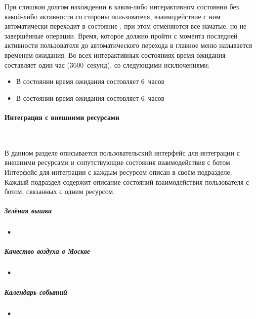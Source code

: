     При слишком долгом нахождении в каком-либо интерактивном состоянии без какой-либо активности
    со стороны пользователя, взаимодействие с ним автоматически переходит в состояние
    \hyperref[itm:req:ui:states:mainmenu]
    {}, при этом отменяются все начатые, но не завершённые операции.
    Время, которое должно пройти с момента последней активности пользователя до
    автоматического перехода в главное меню называется временем ожидания. Во всех интерактивных
    состояниях время ожидания составляет один час (3600~секунд), со следующими исключениями:
    \begin{itemize}
        \item
            В состоянии
            \hyperref[itm:req:ui:states:edit-note]
            {}
            время ожидания состовляет 6~часов
        \item
            В состоянии
            \hyperref[itm:req:ui:states:create-note]
            {}
            время ожидания состовляет 6~часов
    \end{itemize}

    \paragraph{Интеграция с внешними ресурсами}
        \label{par:req:ui:states:integrations}
        ~\par
        В данном разделе описывается пользовательский интерфейс для интеграции с внешними
        ресурсами и сопутствующие состояния взаимодействия с ботом.
        Интерфейс для интеграции с каждым ресурсом описан в своём подразделе.
        Каждый подраздел содержит описание состояний взаимодействия пользователя с ботом,
        связанных с одним ресурсом.

        \subparagraph{Зелёная вышка}
            \begin{itemize}
                \item
            \end{itemize}

        \subparagraph{Качество воздуха в Москве}
            \begin{itemize}
                \item
            \end{itemize}

        \subparagraph{Календарь событий}
            \begin{itemize}
                \item
            \end{itemize}
    \endgroup
